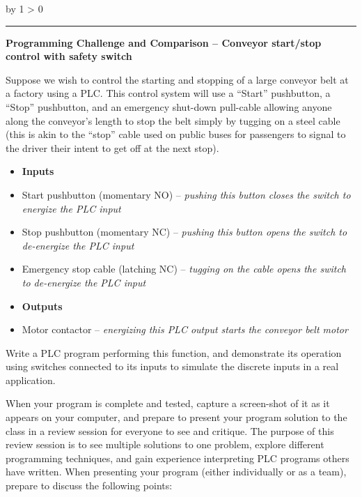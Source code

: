 \documentclass[12pt,a4paper]{article}
\def\oppgave{
            \advance\questnum by 1
            \ifnum \questnum > 0
                 \hrule
                 \vskip 3pt
                 \leftline{Oppgave \the\questnum}
                 \vskip 3pt \fi}
\begin{document}
\oppgave{} 

\noindent
{\bf Programming Challenge and Comparison -- Conveyor start/stop control with safety switch} 

\vskip 10pt

Suppose we wish to control the starting and stopping of a large conveyor belt at a factory using a PLC.  This control system will use a ``Start'' pushbutton, a ``Stop'' pushbutton, and an emergency shut-down pull-cable allowing anyone along the conveyor's length to stop the belt simply by tugging on a steel cable (this is akin to the ``stop'' cable used on public buses for passengers to signal to the driver their intent to get off at the next stop).

\begin{itemize}
\item{} {\bf Inputs} 
\item{} Start pushbutton (momentary NO) -- {\it pushing this button closes the switch to energize the PLC input}
\item{} Stop pushbutton (momentary NC) -- {\it pushing this button opens the switch to de-energize the PLC input}
\item{} Emergency stop cable (latching NC) -- {\it tugging on the cable opens the switch to de-energize the PLC input}
\end{itemize}

\begin{itemize}
\item{} {\bf Outputs} 
\item{} Motor contactor -- {\it energizing this PLC output starts the conveyor belt motor}
\end{itemize}

Write a PLC program performing this function, and demonstrate its operation using switches connected to its inputs to simulate the discrete inputs in a real application.  

\vskip 10pt

When your program is complete and tested, capture a screen-shot of it as it appears on your computer, and prepare to present your program solution to the class in a review session for everyone to see and critique.  The purpose of this review session is to see multiple solutions to one problem, explore different programming techniques, and gain experience interpreting PLC programs others have written.  When presenting your program (either individually or as a team), prepare to discuss the following points:
\end{document}
